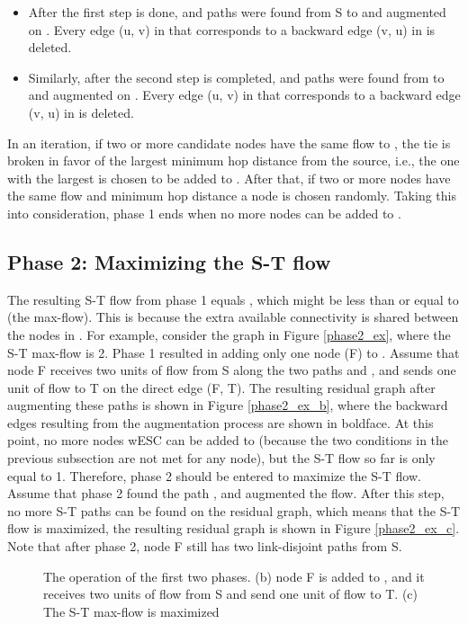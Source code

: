 \documentclass[conference]{IEEEtran}
\begin{document}
\begin{itemize}
\item After the first step is done, and   paths were found from S to  and augmented on . Every edge (u, v) in  that corresponds to a backward edge (v, u) in  is deleted.   
\item Similarly, after the second step is completed, and   paths were found from  to  and augmented on . Every edge (u, v) in  that corresponds to a backward edge (v, u) in  is deleted.   
\end{itemize}

In an iteration, if two or more candidate nodes have the same flow to , the tie is broken in favor of the largest minimum hop distance from the source, i.e., the one with the largest  is chosen to be added to . After that, if two or more nodes have the same flow and minimum hop distance a node is chosen randomly. Taking this into consideration, phase 1 ends when no more nodes can be added to . 




\subsection{Phase 2: Maximizing the S-T flow}

The resulting S-T flow from phase 1 equals , which might be less than or equal to  (the max-flow). This is because the extra available connectivity is shared between the nodes in . For example, consider the graph in Figure \ref{phase2_ex}, where the S-T max-flow is 2. Phase 1 resulted in adding only one node (F) to . Assume that node F receives two units of flow from S along the two paths  and , and sends one unit of flow to T on the direct edge (F, T). The resulting residual graph after augmenting these paths is shown in Figure \ref{phase2_ex_b}, where the backward edges resulting from the augmentation process are shown in boldface. At this point, no more nodes wESC can be added to  (because the two conditions in the previous subsection are not met for any node), but the S-T flow so far is only equal to 1. Therefore, phase 2 should be entered to maximize the S-T flow. Assume that phase 2 found the path , and augmented the flow. After this step, no more S-T paths can be found on the residual graph, which means that the S-T flow is maximized, the resulting residual graph is shown in Figure \ref{phase2_ex_c}. Note that after phase 2, node F still has two link-disjoint paths from S.

\begin{figure}[htp]
\begin{center}
\end{center}
\caption{The operation of the first two phases. (b) node F is added to , and it receives two units of flow from S and send one unit of flow to T. (c) The S-T max-flow is maximized}
\label{fig:phase2_ex}
\end{figure}
\end{document}
